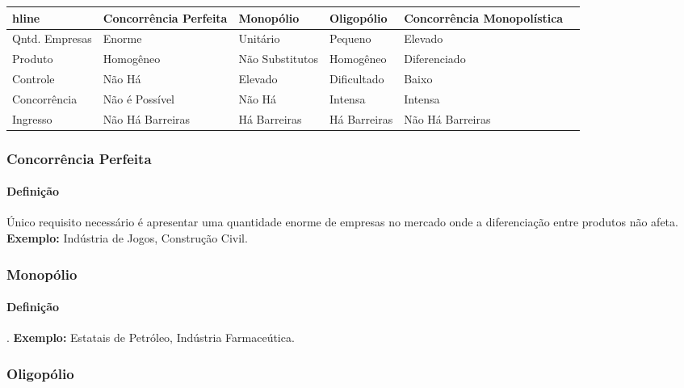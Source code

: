 \documentclass{article}
\begin{document}
                \begin{table}[H]
                    \centering  
                    \begin{tabular}[]{l|lllll}hline
                                       & Concorrência Perfeita & Monopólio       & Oligopólio   & Concorrência Monopolística\\\hline
                        Qntd. Empresas & Enorme                & Unitário        & Pequeno      & Elevado\\
                        Produto        & Homogêneo             & Não Substitutos & Homogêneo    & Diferenciado\\
                        Controle       & Não Há                & Elevado         & Dificultado  & Baixo\\
                        Concorrência   & Não é Possível        & Não Há          & Intensa      & Intensa\\
                        Ingresso       & Não Há Barreiras      & Há Barreiras    & Há Barreiras & Não Há Barreiras\\\hline
                    \end{tabular}
                \end{table}

        \subsubsection{Concorrência Perfeita}
            \paragraph{Definição}Único requisito necessário é apresentar uma quantidade enorme de empresas no mercado onde a diferenciação entre produtos não afeta. \textbf{Exemplo:} Indústria de Jogos, Construção Civil.

        \subsubsection{Monopólio}
            \paragraph{Definição}. \textbf{Exemplo:} Estatais de Petróleo, Indústria Farmaceútica.

        \subsubsection{Oligopólio}
\end{document}
